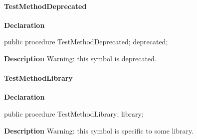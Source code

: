 \documentclass{report}
\begin{document}
\paragraph*{TestMethodDeprecated}\hspace*{\fill}

\begin{list}{}{
\setlength{\itemindent}{0cm}
\setlength{\listparindent}{0cm}
\setlength{\leftmargin}{\evensidemargin}
\addtolength{\leftmargin}{\tmplength}
\settowidth{\labelsep}{X}
\addtolength{\leftmargin}{\labelsep}
\setlength{\labelwidth}{\tmplength}
}
\begin{flushleft}
\item[\textbf{Declaration}\hfill]
\begin{ttfamily}
public procedure TestMethodDeprecated; deprecated;\end{ttfamily}


\end{flushleft}
\par
\item[\textbf{Description}]
Warning: this symbol is deprecated.

 

\end{list}
\paragraph*{TestMethodLibrary}\hspace*{\fill}

\begin{list}{}{
\setlength{\itemindent}{0cm}
\setlength{\listparindent}{0cm}
\setlength{\leftmargin}{\evensidemargin}
\addtolength{\leftmargin}{\tmplength}
\settowidth{\labelsep}{X}
\addtolength{\leftmargin}{\labelsep}
\setlength{\labelwidth}{\tmplength}
}
\begin{flushleft}
\item[\textbf{Declaration}\hfill]
\begin{ttfamily}
public procedure TestMethodLibrary; library;\end{ttfamily}


\end{flushleft}
\par
\item[\textbf{Description}]
Warning: this symbol is specific to some library.

 

\end{list}
\end{document}
